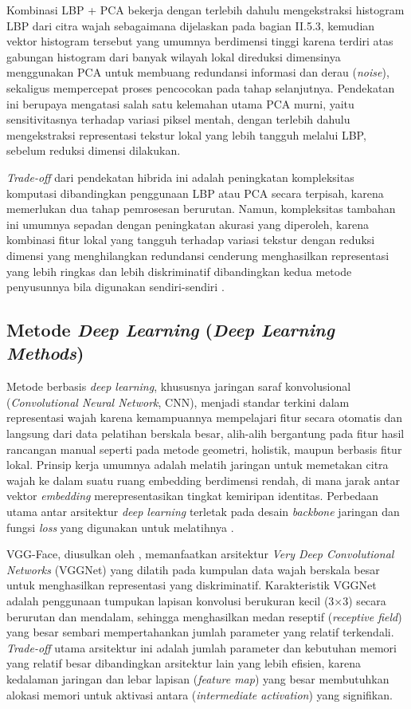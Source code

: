 Kombinasi LBP + PCA bekerja dengan terlebih dahulu mengekstraksi histogram LBP dari citra wajah sebagaimana dijelaskan pada bagian II.5.3, kemudian vektor histogram tersebut yang umumnya berdimensi tinggi karena terdiri atas gabungan histogram dari banyak wilayah lokal direduksi dimensinya menggunakan PCA untuk membuang redundansi informasi dan derau (\textit{noise}), sekaligus mempercepat proses pencocokan pada tahap selanjutnya. Pendekatan ini berupaya mengatasi salah satu kelemahan utama PCA murni, yaitu sensitivitasnya terhadap variasi piksel mentah, dengan terlebih dahulu mengekstraksi representasi tekstur lokal yang lebih tangguh melalui LBP, sebelum reduksi dimensi dilakukan.

\textit{Trade-off} dari pendekatan hibrida ini adalah peningkatan kompleksitas komputasi dibandingkan penggunaan LBP atau PCA secara terpisah, karena memerlukan dua tahap pemrosesan berurutan. Namun, kompleksitas tambahan ini umumnya sepadan dengan peningkatan akurasi yang diperoleh, karena kombinasi fitur lokal yang tangguh terhadap variasi tekstur dengan reduksi dimensi yang menghilangkan redundansi cenderung menghasilkan representasi yang lebih ringkas dan lebih diskriminatif dibandingkan kedua metode penyusunnya bila digunakan sendiri-sendiri \autocite{Trigueros2018}.

\subsection{Metode \textit{Deep Learning} (\textit{Deep Learning Methods})}

Metode berbasis \textit{deep learning}, khususnya jaringan saraf konvolusional (\textit{Convolutional Neural Network}, CNN), menjadi standar terkini dalam representasi wajah karena kemampuannya mempelajari fitur secara otomatis dan langsung dari data pelatihan berskala besar, alih-alih bergantung pada fitur hasil rancangan manual seperti pada metode geometri, holistik, maupun berbasis fitur lokal. Prinsip kerja umumnya adalah melatih jaringan untuk memetakan citra wajah ke dalam suatu ruang embedding berdimensi rendah, di mana jarak antar vektor \textit{embedding} merepresentasikan tingkat kemiripan identitas. Perbedaan utama antar arsitektur \textit{deep learning} terletak pada desain \textit{backbone} jaringan dan fungsi \textit{loss} yang digunakan untuk melatihnya \autocite{Trigueros2018}.

VGG-Face, diusulkan oleh \textcite{parkhi2015deep}, memanfaatkan arsitektur \textit{Very Deep Convolutional Networks} (VGGNet) yang dilatih pada kumpulan data wajah berskala besar untuk menghasilkan representasi yang diskriminatif. Karakteristik VGGNet adalah penggunaan tumpukan lapisan konvolusi berukuran kecil (3×3) secara berurutan dan mendalam, sehingga menghasilkan medan reseptif (\textit{receptive field}) yang besar sembari mempertahankan jumlah parameter yang relatif terkendali. \textit{Trade-off} utama arsitektur ini adalah jumlah parameter dan kebutuhan memori yang relatif besar dibandingkan arsitektur lain yang lebih efisien, karena kedalaman jaringan dan lebar lapisan (\textit{feature map}) yang besar membutuhkan alokasi memori untuk aktivasi antara (\textit{intermediate activation}) yang signifikan.

